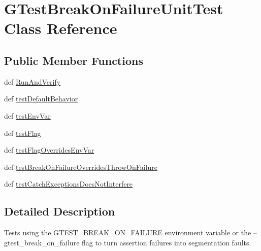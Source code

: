 \hypertarget{classgtest__break__on__failure__unittest_1_1GTestBreakOnFailureUnitTest}{\section{\-G\-Test\-Break\-On\-Failure\-Unit\-Test \-Class \-Reference}
\label{d8/de1/classgtest__break__on__failure__unittest_1_1GTestBreakOnFailureUnitTest}
}
\subsection*{\-Public \-Member \-Functions}
\begin{DoxyCompactItemize}
\item 
def \hyperlink{classgtest__break__on__failure__unittest_1_1GTestBreakOnFailureUnitTest_adc02f4ab231c886fc73ece7b7ee533c1}{\-Run\-And\-Verify}
\item 
def \hyperlink{classgtest__break__on__failure__unittest_1_1GTestBreakOnFailureUnitTest_a9da84d75ab4797f2c3730d5974ed3823}{test\-Default\-Behavior}
\item 
def \hyperlink{classgtest__break__on__failure__unittest_1_1GTestBreakOnFailureUnitTest_a34c43c798b9dd9e170007a9018f196e2}{test\-Env\-Var}
\item 
def \hyperlink{classgtest__break__on__failure__unittest_1_1GTestBreakOnFailureUnitTest_a02b1b74bbc5e2eecc6d6c4117de89a81}{test\-Flag}
\item 
def \hyperlink{classgtest__break__on__failure__unittest_1_1GTestBreakOnFailureUnitTest_acfa6c563d6c35b14e6d2749a0da630f6}{test\-Flag\-Overrides\-Env\-Var}
\item 
def \hyperlink{classgtest__break__on__failure__unittest_1_1GTestBreakOnFailureUnitTest_ae7f5f4b17545fbb6f32e7fb08d3c5866}{test\-Break\-On\-Failure\-Overrides\-Throw\-On\-Failure}
\item 
def \hyperlink{classgtest__break__on__failure__unittest_1_1GTestBreakOnFailureUnitTest_a508a75b728cb09e7ae24e241896ca7a2}{test\-Catch\-Exceptions\-Does\-Not\-Interfere}
\end{DoxyCompactItemize}


\subsection{\-Detailed \-Description}
\begin{DoxyVerb}Tests using the GTEST_BREAK_ON_FAILURE environment variable or
the --gtest_break_on_failure flag to turn assertion failures into
segmentation faults.
\end{DoxyVerb}
 

